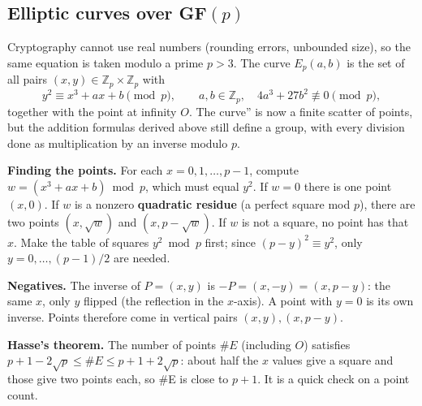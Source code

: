 \subsection{Elliptic curves over GF$(p)$ \new}

Cryptography cannot use real numbers (rounding errors, unbounded size), so the same equation is taken modulo a prime $p > 3$. The curve $E_p(a, b)$ is the set of all pairs $(x, y) \in \mathbb{Z}_p \times \mathbb{Z}_p$ with
\[
y^2 \equiv x^3 + ax + b \pmod p, \qquad a, b \in \mathbb{Z}_p,\quad 4a^3 + 27b^2 \not\equiv 0 \pmod p,
\]
together with the point at infinity $O$. The curve'' is now a finite scatter of points, but the addition formulas derived above still define a group, with every division done as multiplication by an inverse modulo $p$.

\textbf{Finding the points.} For each $x = 0, 1, \dots, p-1$, compute $w = (x^3 + ax + b) \bmod p$, which must equal $y^2$. If $w = 0$ there is one point $(x, 0)$. If $w$ is a nonzero \textbf{quadratic residue} (a perfect square mod $p$), there are two points $(x, \sqrt w)$ and $(x, p - \sqrt w)$. If $w$ is not a square, no point has that $x$. Make the table of squares $y^2 \bmod p$ first; since $(p - y)^2 \equiv y^2$, only $y = 0, \dots, (p-1)/2$ are needed.

\textbf{Negatives.} The inverse of $P = (x, y)$ is $-P = (x, -y) = (x, p - y)$: the same $x$, only $y$ flipped (the reflection in the $x$-axis). A point with $y = 0$ is its own inverse. Points therefore come in vertical pairs $(x, y), (x, p - y)$.

\textbf{Hasse's theorem.} The number of points $\#E$ (including $O$) satisfies $p + 1 - 2\sqrt p \le \#E \le p + 1 + 2\sqrt p$: about half the $x$ values give a square and those give two points each, so \#E is close to $p + 1$. It is a quick check on a point count.

